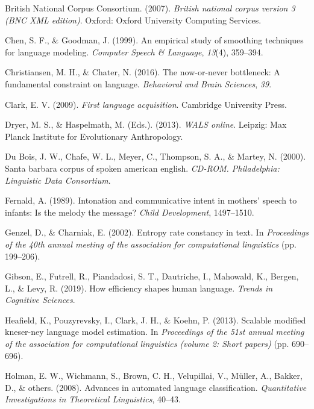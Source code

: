 \documentclass[10pt, letterpaper]{article}
\begin{document}
\leavevmode\hypertarget{ref-british-national-corpus-consortium2007}{}%
British National Corpus Consortium. (2007). \emph{British national
corpus version 3 (BNC XML edition)}. Oxford: Oxford University Computing
Services.

\leavevmode\hypertarget{ref-chen1999}{}%
Chen, S. F., \& Goodman, J. (1999). An empirical study of smoothing
techniques for language modeling. \emph{Computer Speech \& Language},
\emph{13}(4), 359--394.

\leavevmode\hypertarget{ref-christiansen2016}{}%
Christiansen, M. H., \& Chater, N. (2016). The now-or-never bottleneck:
A fundamental constraint on language. \emph{Behavioral and Brain
Sciences}, \emph{39}.

\leavevmode\hypertarget{ref-clark2009}{}%
Clark, E. V. (2009). \emph{First language acquisition}. Cambridge
University Press.

\leavevmode\hypertarget{ref-2013}{}%
Dryer, M. S., \& Haspelmath, M. (Eds.). (2013). \emph{WALS online}.
Leipzig: Max Planck Institute for Evolutionary Anthropology.

\leavevmode\hypertarget{ref-sbc}{}%
Du Bois, J. W., Chafe, W. L., Meyer, C., Thompson, S. A., \& Martey, N.
(2000). Santa barbara corpus of spoken american english. \emph{CD-ROM.
Philadelphia: Linguistic Data Consortium}.

\leavevmode\hypertarget{ref-fernald1989}{}%
Fernald, A. (1989). Intonation and communicative intent in mothers'
speech to infants: Is the melody the message? \emph{Child Development},
1497--1510.

\leavevmode\hypertarget{ref-genzel2002}{}%
Genzel, D., \& Charniak, E. (2002). Entropy rate constancy in text. In
\emph{Proceedings of the 40th annual meeting of the association for
computational linguistics} (pp. 199--206).

\leavevmode\hypertarget{ref-gibson2019}{}%
Gibson, E., Futrell, R., Piandadosi, S. T., Dautriche, I., Mahowald, K.,
Bergen, L., \& Levy, R. (2019). How efficiency shapes human language.
\emph{Trends in Cognitive Sciences}.

\leavevmode\hypertarget{ref-heafield2013}{}%
Heafield, K., Pouzyrevsky, I., Clark, J. H., \& Koehn, P. (2013).
Scalable modified kneser-ney language model estimation. In
\emph{Proceedings of the 51st annual meeting of the association for
computational linguistics (volume 2: Short papers)} (pp. 690--696).

\leavevmode\hypertarget{ref-holman2008}{}%
Holman, E. W., Wichmann, S., Brown, C. H., Velupillai, V., Müller, A.,
Bakker, D., \& others. (2008). Advances in automated language
classification. \emph{Quantitative Investigations in Theoretical
Linguistics}, 40--43.
\end{document}
